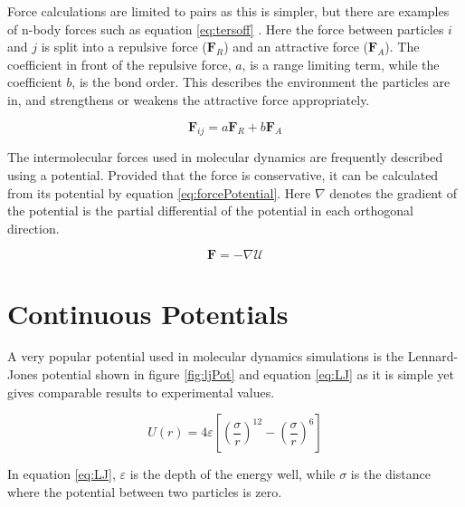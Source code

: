 \message{ !name(main.tex)}\documentclass[12pt]{UoAthesis}
\begin{document}
Force calculations are limited to pairs as this is simpler, but there
are examples of n-body forces such as equation \eqref{eq:tersoff}
\cite{Tersoff1988}.  Here the force between particles $i$ and $j$ is
split into a repulsive force ($\mathbf{F}_R$) and an attractive force
($\mathbf{F}_A$).  The coefficient in front of the repulsive force,
$a$, is a range limiting term, while the coefficient $b$, is the bond
order.  This describes the environment the particles are in, and
strengthens or weakens the attractive force appropriately.

\begin{equation}
  \mathbf{F}_{ij} = a\mathbf{F}_{R} + b\mathbf{F}_A
  \label{eq:tersoff}
\end{equation}

The intermolecular forces used in molecular dynamics are frequently
described using a potential.  Provided that the force is conservative,
it can be calculated from its potential by equation
\eqref{eq:forcePotential}. Here $\nabla$ denotes the gradient of the
potential is the partial differential of the potential in each
orthogonal direction.

\begin{equation} 
  \mathbf{F}=-\nabla \mathcal{U} 
  \label{eq:forcePotential} 
\end{equation}


\section{Continuous Potentials}


A very popular potential used in molecular dynamics simulations is the
Lennard-Jones potential \cite{Lennard-Jones1924} shown in figure
\ref{fig:ljPot} and equation \eqref{eq:LJ} as it is simple yet gives
comparable results to experimental values.

\begin{equation} 
  U(r) = 4 \varepsilon \left[ \left( \frac{\sigma}{r} \right)^{12}
    -\left( \frac{\sigma}{r} \right)^{6} \right] 
  \label{eq:LJ} 
\end{equation}

In equation \eqref{eq:LJ}, $\varepsilon$ is the depth of the energy
well, while $\sigma$ is the distance where the potential between two
particles is zero.
\end{document}
